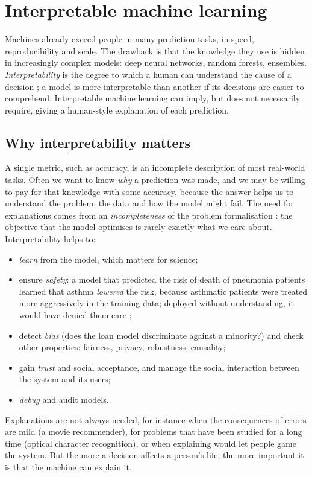 \section{Interpretable machine learning}\label{sec:interpretability}

Machines already exceed people in many prediction tasks, in speed, reproducibility and scale. The
drawback is that the knowledge they use is hidden in increasingly complex models: deep neural
networks, random forests, ensembles. \emph{Interpretability} is the degree to which a human can
understand the cause of a decision \citep{miller2019explanation}; a model is more interpretable
than another if its decisions are easier to comprehend. Interpretable machine learning can imply,
but does not necessarily require, giving a human-style explanation of each prediction.

\subsection{Why interpretability matters}

A single metric, such as accuracy, is an incomplete description of most real-world tasks. Often
we want to know \emph{why} a prediction was made, and we may be willing to pay for that knowledge
with some accuracy, because the answer helps us to understand the problem, the data and how the
model might fail. The need for explanations comes from an \emph{incompleteness} of the problem
formalisation \citep{doshivelez2017towards}: the objective that the model optimises is rarely
exactly what we care about. Interpretability helps to:
\begin{itemize}
  \item \emph{learn} from the model, which matters for science;
  \item ensure \emph{safety}: a model that predicted the risk of death of pneumonia patients learned
        that asthma \emph{lowered} the risk, because asthmatic patients were treated more
        aggressively in the training data; deployed without understanding, it would have
        denied them care \citep{caruana2015intelligible};
  \item detect \emph{bias} (does the loan model discriminate against a minority?) and check other
        properties: fairness, privacy, robustness, causality;
  \item gain \emph{trust} and social acceptance, and manage the social interaction between the
        system and its users;
  \item \emph{debug} and audit models.
\end{itemize}
Explanations are not always needed, for instance when the consequences of errors are mild (a movie
recommender), for problems that have been studied for a long time (optical character
recognition), or when explaining would let people game the system. But the more a decision
affects a person's life, the more important it is that the machine can explain it.

